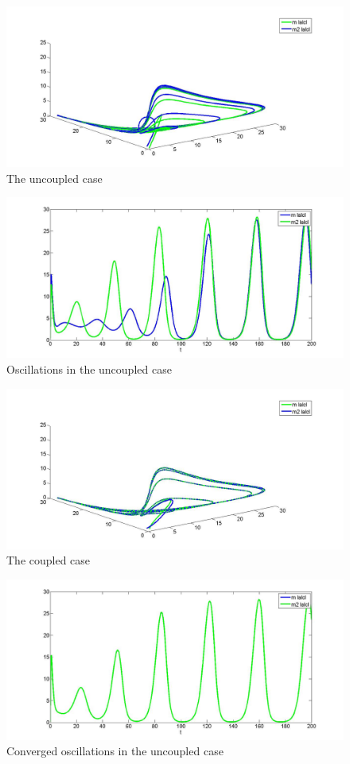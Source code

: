 \documentclass[a4paper]{article}
\begin{document}
 	   \begin{figure}[H]
 	   	\centering
 	   	\includegraphics[width=12cm]{uncoup3d}
 	   	\caption{The uncoupled case }
 	   \end{figure}
 	   \begin{figure}[H]
 	   	\centering
 	   	\includegraphics[width=12cm]{uncouposc}
 	   	\caption{Oscillations in the uncoupled case}
 	   \end{figure} 
 	   \begin{figure}[H]
 	   	\centering
 	   	\includegraphics[width=12cm]{coupled3d}
 	   	\caption{The coupled case }
 	   \end{figure}
 	   \begin{figure}[H]
 	   	\centering
 	   	\includegraphics[width=12cm]{coup_osc}
 	   	\caption{Converged oscillations in the uncoupled case}
 	   \end{figure} 	   	   	
\end{document}
